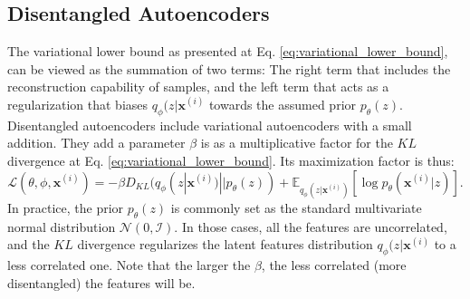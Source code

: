 \documentclass[graybox]{svmult}
\DeclareMathOperator{\argmax}{arg\,max}
\newcommand{\mb}[1]{\mathbf{#1}}
\newcommand{\bx}[0]{\mb{x}}
\newcommand{\mathL}[0]{\mathcal{L}}
\begin{document}

\subsection{Disentangled Autoencoders}
\label{sec:disentangled_autoencoders}
The variational lower bound as presented at Eq.  \ref{eq:variational_lower_bound}, can be viewed as the summation of two terms: The right term that includes the reconstruction capability of samples, and the left term that acts as a regularization that biases $q_\phi(z|\bx^{(i)}$ towards the assumed prior $p_\theta(z)$.
Disentangled autoencoders include variational autoencoders with a small addition. They add a parameter $\beta$ is as a multiplicative factor for the $KL$ divergence \cite{betaVAELB} at Eq. \ref{eq:variational_lower_bound}. Its maximization factor is thus:
\begin{equation}
\mathL(\theta,\phi,\bx^{(i)})=-\beta D_{KL}(q_\phi(z|\bx^{(i)})||p_\theta(z))+\mathbb{E}_{q_\phi(z|\bx^{(i)})}[\log{p_\theta(\bx^{(i)}|z)}].
\end{equation}
In practice, the prior $p_\theta(z)$ is commonly set as the standard multivariate normal distribution $\mathcal{N}(0,\mathcal{I})$. In those cases, all the features are uncorrelated, and the $KL$ divergence regularizes the latent features distribution $q_\phi(z|\bx^{(i)}$ to a less correlated one. Note that the larger the $\beta$, the less correlated (more disentangled) the features will be.
\end{document}
